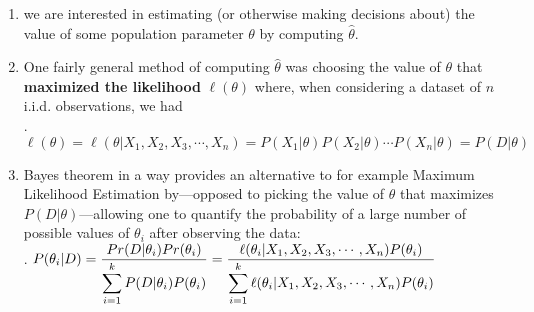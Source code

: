 \begin{enumerate}
    \item we are interested in estimating (or otherwise making decisions about) the value of some population parameter $\theta$ by computing $\hat{\theta}$.
    \hfill \cite{statistics/book/Statistics-for-Data-Scientists/Maurits-Kaptein}

    \item One fairly general method of computing $\hat{\theta}$ was choosing the value of $\theta$ that \textbf{maximized the likelihood} $\ell(\theta)$ where, when considering a dataset of $n$ i.i.d. observations, we had
    \hfill \cite{statistics/book/Statistics-for-Data-Scientists/Maurits-Kaptein}
    \\[0.2cm]
    .\hfill
    $
        \ell(\theta) 
        = \ell(\theta|X_1, X_2, X_3, \cdots , X_n )
        = P(X_1|\theta) P(X_2|\theta) \cdots P(X_n |\theta)
        = P(D|\theta)
    $
    \hfill \cite{statistics/book/Statistics-for-Data-Scientists/Maurits-Kaptein}

    \item Bayes theorem in a way provides an alternative to for example Maximum Likelihood Estimation by—opposed to picking the value of $\theta$ that maximizes $P(D|\theta)$—allowing one to quantify the probability of a large number of possible values of $\theta_i$ after observing the data:
    \hfill \cite{statistics/book/Statistics-for-Data-Scientists/Maurits-Kaptein}
    \\[0.2cm]
    .\hfill
    $
        P(\theta_i |D) 
        =\dfrac{Pr(D|\theta_i ) Pr(\theta_i )}{\displaystyle\sum^k_{i=1} P(D|\theta_i ) P(\theta_i )}
        =\dfrac{\ell(\theta_i |X_1, X_2, X_3, \cdots , X_n ) P(\theta_i )}{\displaystyle\sum^k_{i=1} \ell(\theta_i |X_1, X_2, X_3, \cdots , X_n ) P(\theta_i )}
    $
    \hfill \cite{statistics/book/Statistics-for-Data-Scientists/Maurits-Kaptein}


\end{enumerate}
